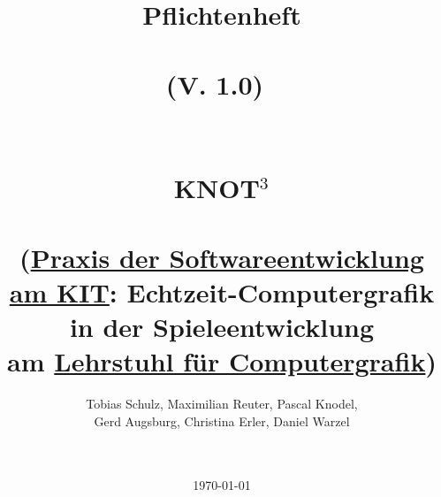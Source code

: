 %
%


%
%







	\title{	
		Pflichtenheft\\~\\\textmd{\Large(V. 1.0)}~\\~\\~\\
		\Huge{KNOT$^3$}\\~\\
		\Large (\href{http://pp.info.uni-karlsruhe.de/lehre/WS201314/pse/}{Praxis der Softwareentwicklung am KIT}: Echtzeit-Computergrafik in der Spieleentwicklung \\am \href{http://cg.ibds.kit.edu/index.php}{Lehrstuhl für Computergrafik})
	}
	
	\author{
		Tobias Schulz, Maximilian Reuter, Pascal Knodel,\\
	 	Gerd Augsburg, Christina Erler, Daniel Warzel
	} 
	 
	\date{~\\~\\\today}
	
	\maketitle





